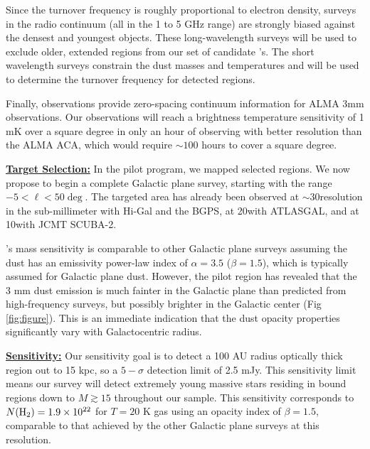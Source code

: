 \documentclass[11pt,preprint]{aastex_nofoot}
\begin{document}
Since the turnover frequency is roughly proportional to electron density,
surveys in the radio continuum (all in the 1 to 5 GHz range) are strongly
biased against the densest and youngest objects.  These long-wavelength surveys
will be used to exclude older, extended \uchii regions from our set of
candidate \hchii's.  The short wavelength surveys constrain the dust masses and
temperatures and will be used to determine the turnover frequency for detected
\hchii regions.

Finally, \MUSTANG observations provide zero-spacing continuum information for
ALMA 3mm observations.  Our observations will reach a brightness temperature
sensitivity of 1 mK over a square degree in only an hour of observing with
better resolution than the ALMA ACA, which would require $\sim100$ hours to
cover a square degree.

\indent\underline{\textbf{\helv Target Selection:}}
In the pilot program, we mapped selected regions.  We now propose to begin a complete
Galactic plane survey, starting with the range $-5 < \ell < 50\deg$.
The targeted area has already been observed at $\sim$30\arcsec resolution in
the sub-millimeter with Hi-Gal and the BGPS, at 20\arcsec with ATLASGAL, and at
10\arcsec with JCMT SCUBA-2.  

\MUSTANG’s mass sensitivity is comparable to other Galactic plane surveys assuming the
dust has an emissivity power-law index of $\alpha=3.5$ ($\beta=1.5$), which is 
typically assumed for Galactic plane
dust.  However, the pilot region has revealed that the 3 mm dust emission is much fainter
in the Galactic plane than predicted from high-frequency surveys,
but possibly brighter in the Galactic center (Fig \ref{fig:figure}).  This is an immediate
indication that the dust opacity properties significantly vary with Galactocentric
radius.

\indent\underline{\textbf{\helv Sensitivity:}}  Our sensitivity goal is to
detect a 100 AU radius optically thick \hii region out to 15 kpc, so a
$5-\sigma$ detection limit of 2.5 mJy.  This sensitivity limit means our survey
will detect extremely young massive stars residing in bound \hii regions down
to $M \gtrsim 15$ \msun throughout our sample.  This sensitivity corresponds to
$N(\textrm{H}_{2})=1.9\times10^{22}$ \persc for $T=20$ K gas using an opacity index of
$\beta=1.5$, comparable to that achieved by the other Galactic plane surveys at
this resolution.


\end{document}
